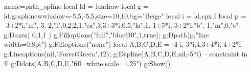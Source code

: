 \begin{luadraw}{name=path_spline}
local ld = luadraw
local g = ld.graph:new{window={-5,5,-5,5},size={10,10},bg="Beige"}
local i = ld.cpx.I
local p = {-3+2*i,"m",-3,-2,"l",0,2,2,1,"ca",3,3+3*i,0.5,"la",1,-1+5*i,-3+2*i,"b",-1,"m",0,"c"}
g:Daxes( {0,1,1} )
g:Filloptions("full","blue!30",1,true); g:Dpath(p,"line width=0.8pt")
g:Filloptions("none")
local A,B,C,D,E = -4-i,-3*i,4,3+4*i,-4+2*i
g:Lineoptions(nil,"ForestGreen",12); g:Dspline({A,B,C,D,E},nil,-5*i) -- constraint in E
g:Ddots({A,B,C,D,E},"fill=white,scale=1.25")
g:Show()
\end{luadraw}
